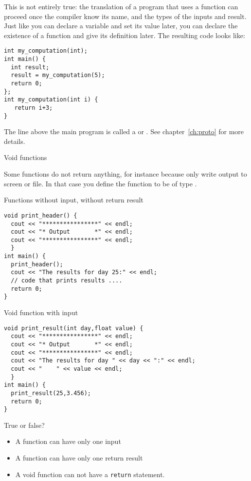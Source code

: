 This is not entirely true: the translation of a program that uses a
function can proceed once the compiler know its name, and the types of
the inputs and result. Just like you can declare a variable and set
its value later, you can declare the existence of a function and give its definition
later. The resulting code looks like:

\begin{lstlisting}
int my_computation(int);
int main() {
  int result;
  result = my_computation(5);
  return 0;
};
int my_computation(int i) {
   return i+3;
}
\end{lstlisting}
The line above the main program is called a
 or
. See chapter~\ref{ch:proto} for
more details.

 {Void functions}

Some functions do not return anything, for instance because only write
output to screen or file. In that case you define the function to be
of type .

\begin{block}{Functions without input, without return result}
  \label{sl:func-ex1}
\begin{lstlisting}
void print_header() {
  cout << "****************" << endl;
  cout << "* Output       *" << endl;
  cout << "****************" << endl;
  }
int main() {
  print_header();
  cout << "The results for day 25:" << endl;
  // code that prints results ....
  return 0;
}
\end{lstlisting}
\end{block}

\begin{block}{Void function with input}
  \label{sl:func-ex2}
\begin{lstlisting}
void print_result(int day,float value) {
  cout << "****************" << endl;
  cout << "* Output       *" << endl;
  cout << "****************" << endl;
  cout << "The results for day " << day << ":" << endl;
  cout << "    " << value << endl;
  }
int main() {
  print_result(25,3.456);
  return 0;
}
\end{lstlisting}
\end{block}

\begin{review}
  \label{rev:func-param}
  True or false?
  \begin{itemize}
  \item A function can have only one input
  \item A function can have only one return result
  \item A void function can not have a \lstinline{return} statement.
  \end{itemize}
\end{review}

